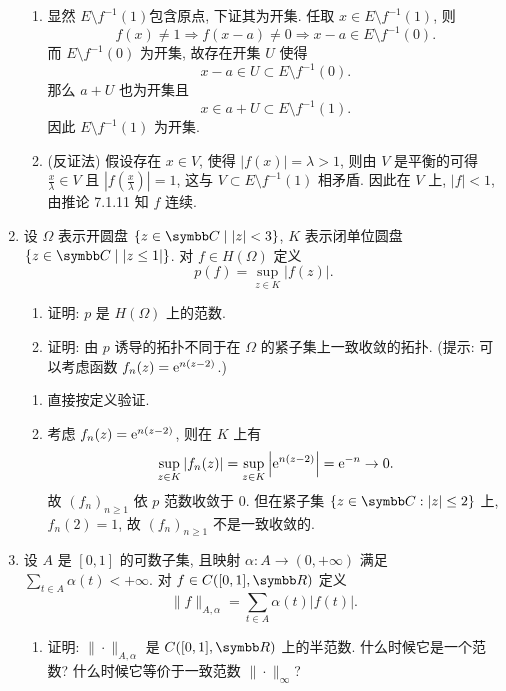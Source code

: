 \begin{enumerate}
\begin{answer}
\begin{enumerate}
        \item 显然 $E\setminus f^{-1}(1)$包含原点,
        下证其为开集. 任取 $x\in E\setminus f^{-1}(1)$, 则 
        \[f(x)\neq 1\Rightarrow f(x-a)\neq 0\Rightarrow x-a\in E\setminus f^{-1}(0).\]
        而 $E\setminus f^{-1}(0)$ 为开集, 故存在开集 $U$ 使得 
        \[x-a\in U\subset E\setminus f^{-1}(0).\]
        那么 $a+U$ 也为开集且
        \[x\in a+U\subset E\setminus f^{-1}(1).\]
        因此 $E\setminus f^{-1}(1)$ 为开集.
    
        \item (反证法) 假设存在 $x\in V$, 使得 $|f(x)|=\lambda>1$,
        则由 $V$ 是平衡的可得 $\frac{x}{\lambda}\in V$ 且 $|f(\frac{x}{\lambda})|=1$,
        这与 $V\subset E\setminus f^{-1}(1)$ 相矛盾.
        因此在 $V$ 上, $|f|<1$, 由推论 7.1.11 知 $f$ 连续.
      \end{enumerate}
    \end{answer}
  \item 设 $\varOmega$ 表示开圆盘 $\{z\in\C\mid |z|<3\}$, $K$ 表示闭单位圆盘 $\{z\in\C\mid |z\leq 1|\}$.
  对 $f\in H(\varOmega)$ 定义
  \[p(f)=\sup_{z\in K}|f(z)|.\]

    \begin{enumerate}
      \item 证明: $p$ 是 $H(\varOmega)$ 上的范数.

      \item 证明: 由 $p$ 诱导的拓扑不同于在 $\varOmega$ 的紧子集上一致收敛的拓扑.
      (提示: 可以考虑函数 $f_n(z)=\mathrm{e}^{n(z-2)}$.)
    \end{enumerate}
    \begin{answer}
      \begin{enumerate}
        \item 直接按定义验证.

        \item 考虑 $f_n(z)=\mathrm{e}^{n(z-2)}$, 则在 $K$ 上有
        \[\sup_{z\in K}|f_n(z)|=\sup_{z\in K}\left|\mathrm{e}^{n(z-2)}\right|=\mathrm{e}^{-n}\to 0.\]
        故 $(f_n)_{n\geq 1}$ 依 $p$ 范数收敛于 $0$.
        但在紧子集 $\{z\in\C: |z|\leq 2\}$ 上, $f_n(2)=1$, 故 $(f_n)_{n\geq 1}$ 不是一致收敛的.
      \end{enumerate}
    \end{answer}
  \item 设 $A$ 是 $[0,1]$ 的可数子集, 且映射 $\alpha: A \rightarrow(0,+\infty)$ 
  满足 $\sum_{t\in A}\alpha(t)<+\infty$. 对 $f\in C([0,1],\R)$ 定义
  \[\|f\|_{A,\alpha}=\sum_{t\in A}\alpha(t)|f(t)|.\]

    \begin{enumerate}
      \item 证明: $\|\cdot\|_{A,\alpha}$ 是 $C([0,1],\R)$ 上的半范数. 什么时候它是一个范数? 
      什么时候它等价于一致范数 $\|\cdot\|_{\infty}$?
  

\end{enumerate}
\end{enumerate}
